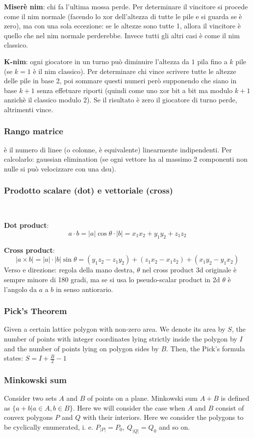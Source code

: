 \textbf{Miserè nim}: chi fa l'ultima mossa perde. Per determinare il vincitore si procede come il nim normale (facendo lo xor dell'altezza di tutte le pile e si guarda se è zero), ma con una sola eccezione: se le altezze sono tutte 1, allora il vincitore è quello che nel nim normale perderebbe. Invece tutti gli altri casi è come il nim classico.

\textbf{K-nim}: ogni giocatore in un turno può diminuire l'altezza da $1$ pila fino a $k$ pile (se $k=1$ è il nim classico). Per determinare chi vince scrivere tutte le altezze delle pile in base 2, poi sommare questi numeri però supponendo che siano in base $k+1$ senza effetuare riporti (quindi come uno xor bit a bit ma modulo $k+1$ anzichè il classico modulo 2). Se il risultato è zero il giocatore di turno perde, altrimenti vince.

\subsubsection{Rango matrice}
è il numero di linee (o colonne, è equivalente) linearmente indipendenti. Per calcolarlo: gaussian elimination (se ogni vettore ha al massimo 2 componenti non nulle si può velocizzare con una dsu).

\subsubsection{Prodotto scalare (dot) e vettoriale (cross)} 
\,

\textbf{Dot product}: 
$$a\cdot b = |a| \cos \theta \cdot |b| = x_1 x_2 + y_1 y_2 + z_1 z_2$$

\textbf{Cross product}:  
$$|a\times b| = |a| \cdot |b| \sin \theta = (y_1 z_2 - z_1 y_2) + (z_1 x_2 - x_1 z_2) + (x_1 y_2 - y_1 x_2)$$ 
Verso e direzione: regola della mano destra, $\theta$ nel cross product 3d originale è sempre minore di 180 gradi, ma se si usa lo pseudo-scalar product in 2d $\theta$ è l'angolo da $a$ a $b$ in senso antiorario.

\subsubsection{Pick's Theorem}
Given a certain lattice polygon with non-zero area.
We denote its area by $S$, the number of points with integer coordinates lying strictly inside the polygon by $I$ and the number of points lying on polygon sides by $B$.
Then, the Pick's formula states: $S=I+\frac{B}{2}-1$

\subsubsection{Minkowski sum}
Consider two sets $A$ and $B$ of points on a plane. Minkowski sum $A + B$ is defined as $\{a + b| a \in A, b \in B\}$.
Here we will consider the case when $A$ and $B$ consist of convex polygons $P$ and $Q$ with their interiors.
Here we consider the polygons to be cyclically enumerated, i. e. $P_{|P|} = P_0,\ Q_{|Q|} = Q_0$ and so on.


